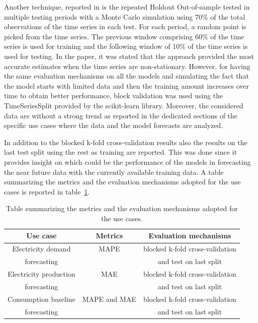 Another technique, reported in \cite{Cerqueira2020} is the repeated Holdout Out‐of‐sample tested in multiple testing periods with a Monte Carlo simulation using 70\% of the total observations of the time series in each test.
For each period, a random point is picked from the time series.
The previous window comprising 60\% of the time series is used for training and the following window of 10\% of the time series is used for testing.
In the paper, it was stated that the approach provided the most accurate estimates when the time series are non-stationary.
However, for having the same evaluation mechanisms on all the models and simulating the fact that the model starts with limited data and then the training amount increases over time to obtain better performance, block validation was used using the TimeSeriesSplit provided by the scikit-learn library.
Moreover, the considered data are without a strong trend as reported in the dedicated sections of the specific use cases where the data and the model forecasts are analyzed.

In addition to the blocked k-fold cross-validation results also the results on the last test split using the rest as training are reported.
This was done since it provides insight on which could be the performance of the models in forecasting the near future data with the currently available training data.
A table summarizing the metrics and the evaluation mechanisms adopted for the use cases is reported in table~\ref{tab:metricstable}.

\begin{table}[H]
\centering
\begin{tabular}{|c|c|c|}
\hline
\textbf{Use case} & \textbf{Metrics} & \textbf{Evaluation mechanisms}\\
\hline
Electricity demand & MAPE & blocked k-fold cross-validation\\
forecasting & & and test on last split\\
\hline
Electricity production & MAE & blocked k-fold cross-validation\\
forecasting & & and test on last split\\
\hline
Consumption baseline & MAPE and MAE & blocked k-fold cross-validation\\
forecasting & & and test on last split\\
\hline
\end{tabular}
\caption{Table summarizing the metrics and the evaluation mechanisms adopted for the use cases.}
\label{tab:metricstable}
\end{table}



